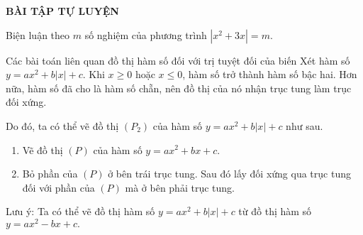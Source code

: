 \begin{center}
\textbf{BÀI TẬP TỰ LUYỆN}
\end{center}
\begin{bt}%
Biện luận theo $m$ số nghiệm của phương trình $|x^2+3x|=m.$
\end{bt}
\begin{dang}{Các bài toán liên quan đồ thị hàm số đối với trị tuyệt đối của biến}
Xét hàm số $y=a x^2+b|x|+c.$ Khi $x\ge 0$ hoặc $x\le 0$, hàm số trở thành hàm số bậc hai. Hơn nữa, hàm số đã cho là hàm số chẵn, nên đồ thị của nó nhận trục tung làm trục đối xứng. 

Do đó, ta có thể vẽ đồ thị $(P_2)$ của hàm số $y=a x^2+b|x|+c$ như sau.
\begin{enumerate}\item Vẽ đồ thị $(P)$ của hàm số $y=a x^2+bx+c.$
\item Bỏ phần của $(P)$ ở bên trái trục tung. Sau đó lấy đối xứng qua trục tung đối với phần của $(P)$ mà ở bên phải trục tung.
\end{enumerate}
Lưu ý: Ta có thể vẽ đồ thị hàm số $y=a x^2+b|x|+c$ từ đồ thị hàm số $y=a x^2-bx+c.$
\end{dang}
